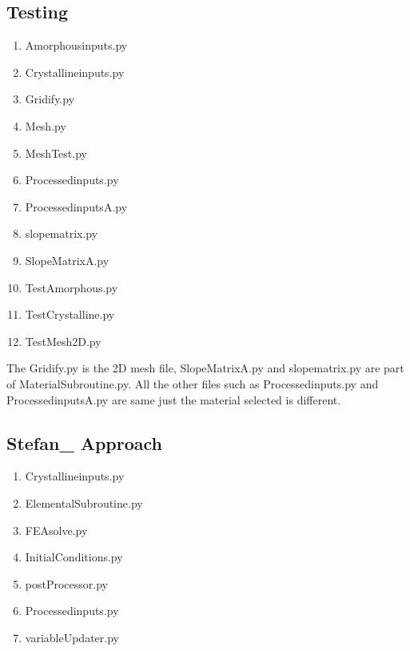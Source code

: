 \subsection{Testing}
\begin{enumerate}
    \item Amorphous\textunderscore inputs.py
    \item Crystalline\textunderscore inputs.py
    \item Gridify.py
    \item Mesh.py
    \item Mesh\textunderscore Test.py
    \item Processed\textunderscore inputs.py
    \item Processed\textunderscore inputsA.py
    \item slope\textunderscore matrix.py
    \item Slope\textunderscore MatrixA.py
    \item Test\textunderscore Amorphous.py
    \item Test\textunderscore Crystalline.py
    \item Test\textunderscore Mesh\textunderscore 2D.py
\end{enumerate}
The Gridify.py is the 2D mesh file, Slope\textunderscore MatrixA.py and slope\textunderscore matrix.py are part of Material\textunderscore Subroutine.py. All the other files such as Processed\textunderscore inputs.py and Processed\textunderscore inputsA.py are same just the material selected is different.  
\subsection{Stefan\_ Approach}
\begin{enumerate}
    \item Crystalline\textunderscore inputs.py
    \item Elemental\textunderscore Subroutine.py
    \item FEA\textunderscore solve.py
    \item Initial\textunderscore Conditions.py
    \item postProcessor.py
    \item Processed\textunderscore inputs.py
    \item variableUpdater.py
\end{enumerate}
